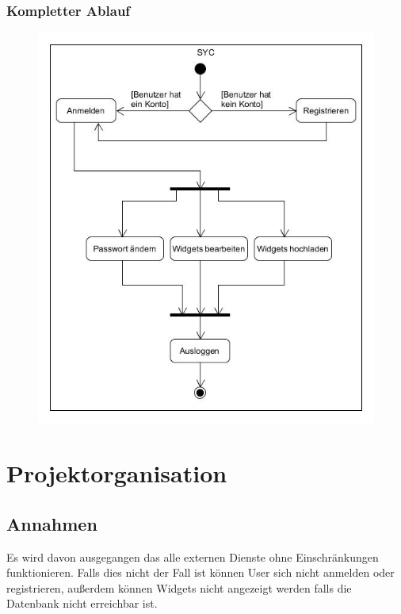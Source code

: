 		\subsubsection{Kompletter Ablauf}
		
			\begin{figure}[H]
				\includegraphics[scale=0.6]{images/ActivityComplete}
			\end{figure}
	

\newpage
\section{Projektorganisation}

	\subsection{Annahmen}
		Es wird davon ausgegangen das alle externen Dienste ohne Einschränkungen funktionieren. Falls dies nicht der Fall ist können User sich nicht anmelden oder registrieren, außerdem können Widgets nicht angezeigt werden falls die Datenbank nicht erreichbar ist.
	
	\label{rolle}
